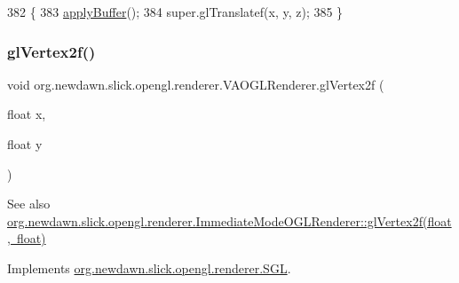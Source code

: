 \begin{DoxyCode}
382                                                         \{
383         \mbox{\hyperlink{classorg_1_1newdawn_1_1slick_1_1opengl_1_1renderer_1_1_v_a_o_g_l_renderer_a7c5d09419cd40761be8f849631aebab5}{applyBuffer}}();
384         super.glTranslatef(x, y, z);
385     \}
\end{DoxyCode}
\mbox{\label{classorg_1_1newdawn_1_1slick_1_1opengl_1_1renderer_1_1_v_a_o_g_l_renderer_a2d875eda69e18a467a6e17f4e7cfaa17}} 
\subsubsection{\texorpdfstring{gl\+Vertex2f()}{glVertex2f()}}
{\footnotesize\ttfamily void org.\+newdawn.\+slick.\+opengl.\+renderer.\+V\+A\+O\+G\+L\+Renderer.\+gl\+Vertex2f (\begin{DoxyParamCaption}\item[{float}]{x,  }\item[{float}]{y }\end{DoxyParamCaption})\hspace{0.3cm}{\ttfamily [inline]}}

\begin{DoxySeeAlso}{See also}
\mbox{\hyperlink{classorg_1_1newdawn_1_1slick_1_1opengl_1_1renderer_1_1_immediate_mode_o_g_l_renderer_a0ebc0c399fb4cd6010f9a13f2ebc927f}{org.\+newdawn.\+slick.\+opengl.\+renderer.\+Immediate\+Mode\+O\+G\+L\+Renderer\+::gl\+Vertex2f(float, float)}} 
\end{DoxySeeAlso}


Implements \mbox{\hyperlink{interfaceorg_1_1newdawn_1_1slick_1_1opengl_1_1renderer_1_1_s_g_l_ad9c89f8bb275f22956f7687da5ec27c5}{org.\+newdawn.\+slick.\+opengl.\+renderer.\+S\+GL}}.


